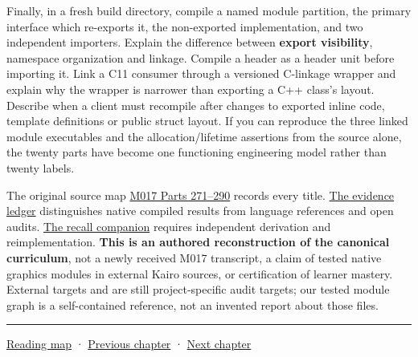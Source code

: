 Finally, in a fresh build directory, compile a named module partition, the primary interface which re-exports it, the non-exported implementation, and two independent importers. Explain the difference between \textbf{export visibility}, namespace organization and linkage. Compile a header as a header unit before importing it. Link a C11 consumer through a versioned C-linkage wrapper and explain why the wrapper is narrower than exporting a C++ class's layout. Describe when a client must recompile after changes to exported inline code, template definitions or public struct layout. If you can reproduce the three linked module executables and the allocation/lifetime assertions from the source alone, the twenty parts have become one functioning engineering model rather than twenty labels.

The original source map \hyperref[appendix-fd090d982a15-m017-parts-271290-lazy-asset-queries-allocation-lifetimes-and-compiled-api-boundaries]{M017 Parts 271--290} records every title. \hyperref[appendix-a103e7846d21-phase-7-additive-reconstruction-m017-parts-271290]{The evidence ledger} distinguishes native compiled results from language references and open audits. \hyperref[appendix-960160274237-from-borrowed-reports-to-module-boundaries-m017-reconstruction]{The recall companion} requires independent derivation and reimplementation. \textbf{This is an authored reconstruction of the canonical curriculum}, not a newly received M017 transcript, a claim of tested native graphics modules in external Kairo sources, or certification of learner mastery. External targets  and  are still project-specific audit targets; our tested module graph is a self-contained reference, not an invented report about those files.

\begin{center}\rule{0.5\linewidth}{0.5pt}\end{center}

\hyperref[volume-reading-map]{Reading map} · \hyperref[05-engine-i-ch005-generic-asset-pipelines-with-stable-identity]{Previous chapter} · \hyperref[05-engine-i-ch007-typed-apis-and-measured-cpu-data-structures]{Next chapter}
